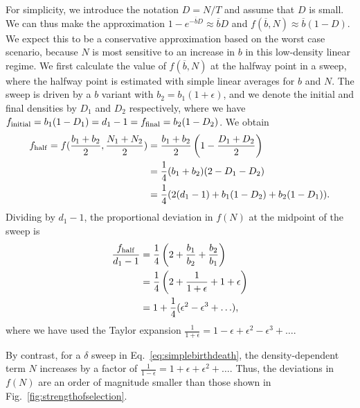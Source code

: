 \documentclass[12pt]{article}
\begin{document}
For simplicity, we introduce the notation $D=N/T$ and assume that $D$ is small. We can thus make the approximation $1-e^{-\overline{b}D}\approx \overline{b}D$ and $f(\overline{b},N)\approx \overline{b}(1-D)$. We expect this to be a conservative approximation based on the worst case scenario, because $N$ is most sensitive to an increase in $b$ in this low-density linear regime. We first calculate the value of $f(\overline{b},N)$ at the halfway point in a sweep, where the halfway point is estimated with simple linear averages for $b$ and $N$. The sweep is driven by a $b$ variant with $b_2=b_1(1+\epsilon)$, and we denote the initial and final densities by $D_1$ and $D_2$ respectively, where we have $f_{\rm initial}=b_1(1-D_1)=d_1-1=f_{\rm final}=b_2(1-D_2)$. We obtain
\begin{align}
f_{\rm{half}}=f(\frac{b_1+b_2}{2},\frac{N_1+N_2}{2})&=\frac{b_1+b_2}{2}\left(1-\frac{D_1+D_2}{2}\right) \nonumber \\
&=\frac{1}{4} (b_1+b_2)(2-D_1-D_2) \nonumber \\
&=\frac{1}{4} (2(d_1-1)+b_1(1-D_2)+b_2(1-D_1)).
\end{align}
Dividing by $d_1-1$, the proportional deviation in $f(N)$ at the midpoint of the sweep is
\begin{align}
\frac{f_{\rm{half}}}{d_1-1}&=\frac{1}{4}\left(2+\frac{b_1}{b_2}+\frac{b_2}{b_1}\right)\nonumber \\
&=\frac{1}{4}\left(2+\frac{1}{1+\epsilon}+1+\epsilon\right)\nonumber \\
&=1+\frac{1}{4}(\epsilon^2-\epsilon^3+\ldots),
\end{align}
where we have used the Taylor expansion $\frac{1}{1+\epsilon}=1-\epsilon+\epsilon^2-\epsilon^3+\ldots$. 

By contrast, for a $\delta$ sweep in Eq.~\eqref{eq:simplebirthdeath}, the density-dependent term $N$ increases by a factor of $\frac{1}{1-\epsilon}=1+\epsilon+\epsilon^2+\ldots$. Thus,  the deviations in $f(N)$ are an order of magnitude smaller than those shown in Fig.~\eqref{fig:strengthofselection}.
\end{document}
